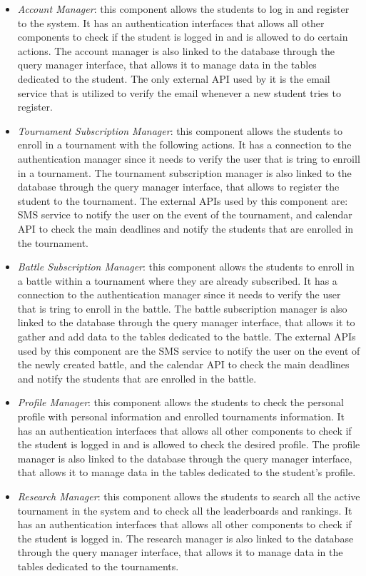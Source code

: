 \documentclass[12pt, a4paper]{report}
\begin{document}
    \begin{itemize}
        \item \textit{Account Manager}: this component allows the students to log in and register to the system.
            It has an authentication interfaces that allows all other components to check if the student is logged in and is allowed to do certain actions. 
            The account manager is also linked to the database through the query manager interface, that allows it to manage data in the tables dedicated to the student.
            The only external API used by it is the email service that is utilized to verify the email whenever a new student tries to register. 
        \item \textit{Tournament Subscription Manager}: this component allows the students to enroll in a tournament with the following actions.
            It has a connection to the authentication manager since it needs to verify the user that is tring to enroill in a tournament. 
            The tournament subscription manager is also linked to the database through the query manager interface, that allows to register the student to the tournament. 
            The external APIs used by this component are: SMS service to notify the user on the event of the tournament, and calendar API to check the main deadlines and notify the students that are enrolled in the tournament.
        \item \textit{Battle Subscription Manager}: this component allows the students to enroll in a battle within a tournament where they are already subscribed. 
            It has a connection to the authentication manager since it needs to verify the user that is tring to enroll in the battle. 
            The battle subscription manager is also linked to the database through the query manager interface, that allows it to gather and add data to the tables dedicated to the battle.
            The external APIs used by this component are the SMS service to notify the user on the event of the newly created battle, and the calendar API to check the main deadlines and notify the students that are enrolled in the battle.
        \item \textit{Profile Manager}: this component allows the students to check the personal profile with personal information and enrolled tournaments information. 
            It has an authentication interfaces that allows all other components to check if the student is logged in and is allowed to check the desired profile. 
            The profile manager is also linked to the database through the query manager interface, that allows it to manage data in the tables dedicated to the student's profile.
        \item \textit{Research Manager}: this component allows the students to search all the active tournament in the system and to check all the leaderboards and rankings. 
            It has an authentication interfaces that allows all other components to check if the student is logged in.
            The research manager is also linked to the database through the query manager interface, that allows it to manage data in the tables dedicated to the tournaments.
    \end{itemize}
\end{document}
